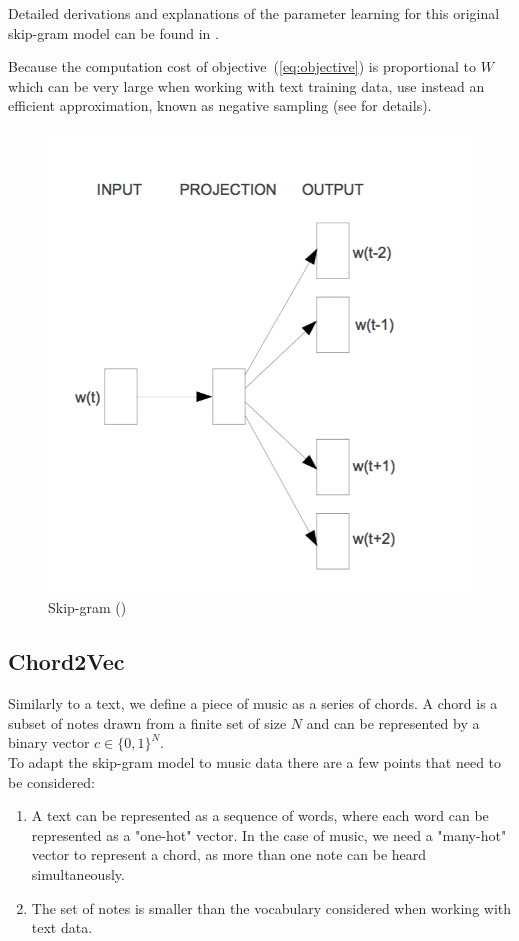 \documentclass[12pt]{article}\pagestyle{myheadings}
\begin{document}
Detailed derivations and explanations of the parameter learning for this original skip-gram model can be found in \citep{Rong14}.

Because the computation cost of objective~(\ref{eq:objective}) is proportional to $W$ which can be very large when working with text training data, \citet{mik2013} use instead an efficient approximation, known as negative sampling (see \citep{NIPS2013_5021} for details). 

\begin{figure}[ht]
\centering
\includegraphics[width=.7\linewidth]{figures/skipgram.png}
\caption{\label{fig:skipgram}Skip-gram (\citet{mik2013})}
\end{figure}


\subsection{Chord2Vec}
Similarly to a text, we define a piece of music as a series of chords. A chord is a subset of notes drawn from a finite set of size $N$ and can be represented by a binary vector $c \in \{0,1\}^N$.\\

\noindent To adapt the skip-gram model to music data there are a few points that need to be considered:

\begin{enumerate}
\item A text can be represented as a sequence of words, where each word can be represented as a "one-hot" vector. In the case of music, we need a "many-hot" vector to represent a chord, as more than one note can be heard simultaneously.  
\item The set of notes is smaller than the vocabulary considered when working with text data.
\end{enumerate}
 
\end{document}
